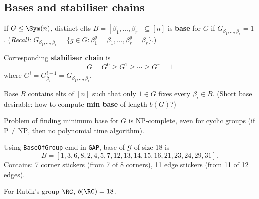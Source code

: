 \subsection{Bases and stabiliser chains}

\begin{slide}
    \begin{definition}
        \vspace{0pt}
        If $G \leq \Sym(n)$, distinct elts $B = [\beta_1,\dotsc,\beta_r] \subseteq [n]$ is \textbf{base} for $G$ if $G_{\beta_1,\dotsc,\beta_r} = 1$. (\textit{Recall:} $G_{\beta_1,\dotsc,\beta_r} = \{g \in G : \beta_1^g = \beta_1,\dotsc,\beta_r^g = \beta_r\}$.) \pause

        Corresponding \textbf{stabiliser chain} is
        \[G = G^0 \geq G^1 \geq \dotsb \geq G^r = 1\]
        where $G^i = G^{i-1}_{\beta_i} = G_{\beta_1,\dotsc,\beta_i}$.
    \end{definition} \pause

    Base $B$ contains elts of $[n]$ such that only $1 \in G$ fixes every $\beta_i \in B$. (Short base desirable: how to compute \textbf{min base} of length $b(G)$?) \pause

    \begin{theorem}[Blaha, 1992]
        \vspace{0pt}
        Problem of finding minimum base for $G$ is NP-complete, even for cyclic groups (if $\mathrm{P} \neq \mathrm{NP}$, then no polynomial time algorithm).
    \end{theorem}
\end{slide}

\begin{slide}
    \begin{example}
        \vspace{0pt}
        Using \texttt{BaseOfGroup} cmd in \texttt{GAP}, base of $\mathcal{G}$ of size 18 is
        $$B = [ 1, 3, 6, 8, 2, 4, 5, 7, 12, 13, 14, 15, 16, 21, 23, 24, 29, 31 ].$$ \pause
        Contains: 7 corner stickers (from 7 of 8 corners), 11 edge stickers (from 11 of 12 edges).
    \end{example}

    \begin{theorem}
        \vspace{0pt}
        For Rubik's group $\RC$, $b(\RC) = 18$.
    \end{theorem}
\end{slide}

